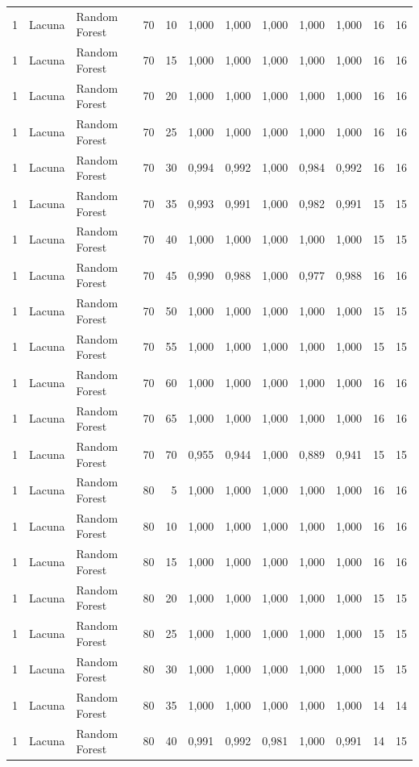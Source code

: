 \begin{longtable}{@{}rllrrrrrrrrr@{}}
1 & Lacuna & Random Forest & 70 & 10 & 1,000 & 1,000 & 1,000 & 1,000 & 1,000 & 16 & 16 \\
1 & Lacuna & Random Forest & 70 & 15 & 1,000 & 1,000 & 1,000 & 1,000 & 1,000 & 16 & 16 \\
1 & Lacuna & Random Forest & 70 & 20 & 1,000 & 1,000 & 1,000 & 1,000 & 1,000 & 16 & 16 \\
1 & Lacuna & Random Forest & 70 & 25 & 1,000 & 1,000 & 1,000 & 1,000 & 1,000 & 16 & 16 \\
1 & Lacuna & Random Forest & 70 & 30 & 0,994 & 0,992 & 1,000 & 0,984 & 0,992 & 16 & 16 \\
1 & Lacuna & Random Forest & 70 & 35 & 0,993 & 0,991 & 1,000 & 0,982 & 0,991 & 15 & 15 \\
1 & Lacuna & Random Forest & 70 & 40 & 1,000 & 1,000 & 1,000 & 1,000 & 1,000 & 15 & 15 \\
1 & Lacuna & Random Forest & 70 & 45 & 0,990 & 0,988 & 1,000 & 0,977 & 0,988 & 16 & 16 \\
1 & Lacuna & Random Forest & 70 & 50 & 1,000 & 1,000 & 1,000 & 1,000 & 1,000 & 15 & 15 \\
1 & Lacuna & Random Forest & 70 & 55 & 1,000 & 1,000 & 1,000 & 1,000 & 1,000 & 15 & 15 \\
1 & Lacuna & Random Forest & 70 & 60 & 1,000 & 1,000 & 1,000 & 1,000 & 1,000 & 16 & 16 \\
1 & Lacuna & Random Forest & 70 & 65 & 1,000 & 1,000 & 1,000 & 1,000 & 1,000 & 16 & 16 \\
1 & Lacuna & Random Forest & 70 & 70 & 0,955 & 0,944 & 1,000 & 0,889 & 0,941 & 15 & 15 \\
1 & Lacuna & Random Forest & 80 & 5 & 1,000 & 1,000 & 1,000 & 1,000 & 1,000 & 16 & 16 \\
1 & Lacuna & Random Forest & 80 & 10 & 1,000 & 1,000 & 1,000 & 1,000 & 1,000 & 16 & 16 \\
1 & Lacuna & Random Forest & 80 & 15 & 1,000 & 1,000 & 1,000 & 1,000 & 1,000 & 16 & 16 \\
1 & Lacuna & Random Forest & 80 & 20 & 1,000 & 1,000 & 1,000 & 1,000 & 1,000 & 15 & 15 \\
1 & Lacuna & Random Forest & 80 & 25 & 1,000 & 1,000 & 1,000 & 1,000 & 1,000 & 15 & 15 \\
1 & Lacuna & Random Forest & 80 & 30 & 1,000 & 1,000 & 1,000 & 1,000 & 1,000 & 15 & 15 \\
1 & Lacuna & Random Forest & 80 & 35 & 1,000 & 1,000 & 1,000 & 1,000 & 1,000 & 14 & 14 \\
1 & Lacuna & Random Forest & 80 & 40 & 0,991 & 0,992 & 0,981 & 1,000 & 0,991 & 14 & 15 \\

\end{longtable}
